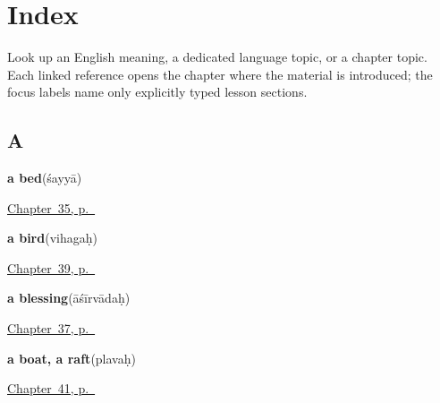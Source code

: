
\chapter*{Index}

Look up an English meaning, a dedicated language topic, or a chapter topic. Each linked reference opens the chapter where the material is introduced; the focus labels name only explicitly typed lesson sections.

\section*{A}

\noindent\begin{minipage}[t]{\linewidth}
\raggedright
\textbf{a bed}\enspace\emph{}\enspace(śayyā)\par
\footnotesize \hyperref[ch:sa-house]{Chapter~35, p.~\pageref*{ch:sa-house}}
\end{minipage}\par\smallskip

\noindent\begin{minipage}[t]{\linewidth}
\raggedright
\textbf{a bird}\enspace\emph{}\enspace(vihagaḥ)\par
\footnotesize \hyperref[ch:sa-animals]{Chapter~39, p.~\pageref*{ch:sa-animals}}
\end{minipage}\par\smallskip

\noindent\begin{minipage}[t]{\linewidth}
\raggedright
\textbf{a blessing}\enspace\emph{}\enspace(āśīrvādaḥ)\par
\footnotesize \hyperref[ch:sa-courtesy-more]{Chapter~37, p.~\pageref*{ch:sa-courtesy-more}}
\end{minipage}\par\smallskip

\noindent\begin{minipage}[t]{\linewidth}
\raggedright
\textbf{a boat, a raft}\enspace\emph{}\enspace(plavaḥ)\par
\footnotesize \hyperref[ch:sa-things-people-make]{Chapter~41, p.~\pageref*{ch:sa-things-people-make}}
\end{minipage}\par\smallskip

